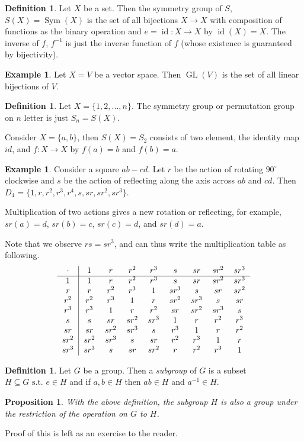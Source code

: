 \documentclass{amsart}
\newtheorem{prop}[thm]{Proposition}
\theoremstyle{definition}
\newtheorem{definition}[thm]{Definition}
\newtheorem{example}[thm]{Example}
\newcommand{\st}{\text{ s.t. }}
\DeclareMathOperator{\Sym}{Sym}
\DeclareMathOperator{\GL}{GL}
\DeclareMathOperator{\id}{id}
\begin{document}
\begin{definition}
	Let $X$ be a set. Then the symmetry group of $S$, $S(X)=\Sym(X)$ is the set of all bijections $X\to X$ with composition of functions as the binary operation and $e=\id:X\to X$ by $\id(X)=X$. The inverse of $f$, $f^{-1}$ is just the inverse function of $f$ (whose existence is guaranteed by bijectivity).
\end{definition}
\begin{example}
	Let $X=V$ be a vector space. Then $\GL(V)$ is the set of all linear bijections of $V$.
\end{example}
\begin{definition}
	Let $X=\{1,2,...,n\}$. The symmetry group or permutation group on $n$ letter is just $S_n=S(X)$.
\end{definition}
Consider $X=\{a,b\}$, then $S(X)=S_2$ consists of two element, the identity map $id$, and $f:X\to X$ by $f(a)=b$ and $f(b)=a$.
\begin{example}
	Consider a square $ab-cd$. Let $r$ be the action of rotating $90^{\circ}$ clockwise and $s$ be the action of reflecting along the axis  across $ab$ and $cd$. Then $D_4=\{1,r,r^2,r^3,r^4,s,sr,sr^2,sr^3\}$.
	
	Multiplication of two actions gives a new rotation or reflecting, for example, $sr(a)=d$, $sr(b)=c$, $sr(c)=d$, and $sr(d)=a$.
	
	Note that we observe $rs=sr^3$, and can thus write the multiplication table as following.
	\begin{equation*}
		\begin{tabular}{c|cccccccc}
			$\cdot$ & $1$&$r$&$r^2$ & $r^3$ &$s$ & $sr$ & $sr^2$& $sr^3$\\
			\hline
			$1$ & $1$&$r$&$r^2$ & $r^3$ &$s$ & $sr$ & $sr^2$& $sr^3$\\
			$r$ & $r$&$r^2$&$r^3$ & $1$ &$sr^3$ & $s$ & $sr$& $sr^2$\\
			$r^2$ & $r^2$&$r^3$&$1$ & $r$ &$sr^2$ & $sr^3$ & $s$& $sr$\\
			$r^3$ & $r^3$&$1$&$r$ & $r^2$ &$sr$ & $sr^2$ & $sr^3$& $s$\\
			$s$ & $s$&$sr$&$sr^2$ & $sr^3$ &$1$ & $r$ & $r^2$& $r^3$\\
			$sr$ & $sr$&$sr^2$&$sr^3$ & $s$ &$r^3$ & $1$ & $r$& $r^2$\\
			$sr^2$ & $sr^2$&$sr^3$&$s$ & $sr$ &$r^2$ & $r^3$ & $1$& $r$\\
			$sr^3$ & $sr^3$&$s$&$sr$ & $sr^2$ &$r$ & $r^2$ & $r^3$& $1$
		\end{tabular}
	\end{equation*}
\end{example}
\begin{definition}
	Let $G$ be a group. Then a \emph{subgroup} of $G$ is a subset $H\subseteq G\st e\in H$ and if $a,b\in H$ then $ab\in H$ and $a^{-1}\in H$.
\end{definition}
\begin{prop}
	With the above definition, the subgroup $H$ is also a group under the restriction of the operation on $G$ to $H$.
\end{prop}
Proof of this is left as an exercise to the reader.
\end{document}
